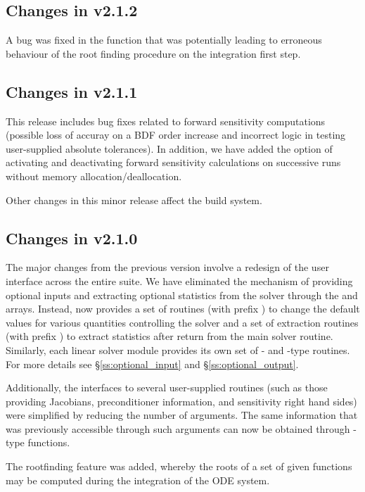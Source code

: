\subsection*{Changes in v2.1.2}

A bug was fixed in the  function that was potentially
leading to erroneous behaviour of the root finding procedure on the 
integration first step.

\subsection*{Changes in v2.1.1}

This {\cvodes} release includes bug fixes related to forward sensitivity
computations (possible loss of accuray on a BDF order increase and incorrect
logic in testing user-supplied absolute tolerances). 
In addition, we have added the option of activating and deactivating
forward sensitivity calculations on successive {\cvodes} runs without memory
allocation/deallocation.

Other changes in this minor {\sundials} release affect the build system.

\subsection*{Changes in v2.1.0}

The major changes from the previous version involve a redesign of the
user interface across the entire {\sundials} suite. We have eliminated the
mechanism of providing optional inputs and extracting optional statistics 
from the solver through the  and  arrays. Instead,
{\cvodes} now provides a set of routines (with prefix )
to change the default values for various quantities controlling the
solver and a set of extraction routines (with prefix )
to extract statistics after return from the main solver routine.
Similarly, each linear solver module provides its own set of {-}
and {-type} routines. For more details see \S\ref{ss:optional_input}
and \S\ref{ss:optional_output}.

Additionally, the interfaces to several user-supplied routines
(such as those providing Jacobians, preconditioner information, and
sensitivity right hand sides) were simplified by reducing the number
of arguments. The same information that was previously accessible
through such arguments can now be obtained through {-type}
functions.

The rootfinding feature was added, whereby the roots of a set of given
functions may be computed during the integration of the ODE system.

